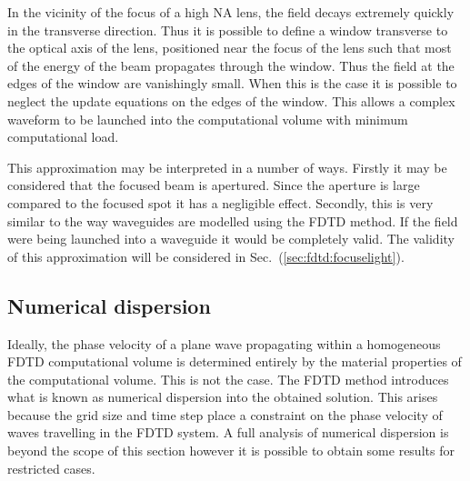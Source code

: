 \documentclass[a4paper, 12pt]{article}
\newcommand{\sect}[1]{Sec.\ (\ref{#1})}
\begin{document}
	In the vicinity of the focus of a high NA lens, the field decays
	extremely quickly in the transverse direction. Thus it is possible to
	define a window transverse to the optical axis of the lens, positioned
	near the focus of the lens such that most of the energy of the beam
	propagates through the window. Thus the field at the edges of the
	window are vanishingly small. When this is the case it is possible to
	neglect the update equations on the edges of the window. This allows a
	complex waveform to be launched into the computational volume with
	minimum computational load.

	This approximation may be interpreted in a number of ways. Firstly it
	may be considered that the focused beam is apertured. Since the aperture is large compared to the focused spot
	it has a negligible effect. Secondly, this is very similar to the way
	waveguides are modelled using the FDTD method. If the field were being launched into a
	waveguide it would be completely valid. The validity of this
	approximation will be considered in \sect{sec:fdtd:focuselight}.
	\subsection{Numerical dispersion}
	\label{sec:fdtd:numdisp}
	Ideally, the phase velocity of a plane wave propagating within a
	homogeneous FDTD computational volume is determined entirely by the
	material properties of the computational volume. This is not the
	case. The FDTD method introduces what is known as numerical dispersion
	into the obtained solution. This arises because the grid size and time
	step place a constraint on the phase velocity of waves travelling in
	the FDTD system. A full analysis of numerical dispersion is beyond the
	scope of this section however it is possible to obtain some results
	for restricted cases.
\end{document}
